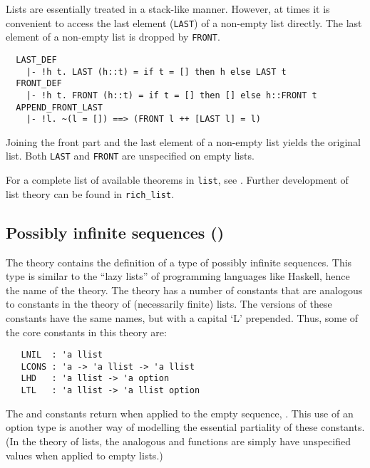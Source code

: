 Lists are essentially treated in a stack-like manner. However, at
times it is convenient to access the last element
({\small\verb+LAST+}) of a non-empty list directly. The last element
of a non-empty list is dropped by {\small\verb+FRONT+}.
%
{\small
\begin{verbatim}
  LAST_DEF
    |- !h t. LAST (h::t) = if t = [] then h else LAST t
  FRONT_DEF
    |- !h t. FRONT (h::t) = if t = [] then [] else h::FRONT t
  APPEND_FRONT_LAST
    |- !l. ~(l = []) ==> (FRONT l ++ [LAST l] = l)
\end{verbatim}}
%
Joining the front part and the last element of a non-empty list yields the original list.
Both {\small\verb+LAST+} and {\small\verb+FRONT+} are unspecified on empty lists.


\noindent For a complete list of available theorems in
{\small\verb+list+}, see \REFERENCE.  Further development of list
theory can be found in {\small\verb+rich_list+}.


\subsection{Possibly infinite sequences ()}

The theory  contains the definition of a type of
possibly infinite sequences.  This type is similar to the ``lazy
lists'' of programming languages like Haskell, hence the name of the
theory.  The  theory has a number of constants that
are analogous to constants in the theory of (necessarily finite)
lists.  The  versions of these constants have the
same names, but with a capital `L\/' prepended.  Thus, some of the core
constants in this theory are:

{\small \begin{verbatim}
   LNIL  : 'a llist
   LCONS : 'a -> 'a llist -> 'a llist
   LHD   : 'a llist -> 'a option
   LTL   : 'a llist -> 'a llist option
\end{verbatim}}

The  and  constants return  when applied to
the empty sequence, .  This use of an option type is another
way of modelling the essential partiality of these constants.  (In the
theory of lists, the analogous  and  functions are
simply have unspecified values when applied to empty lists.)

